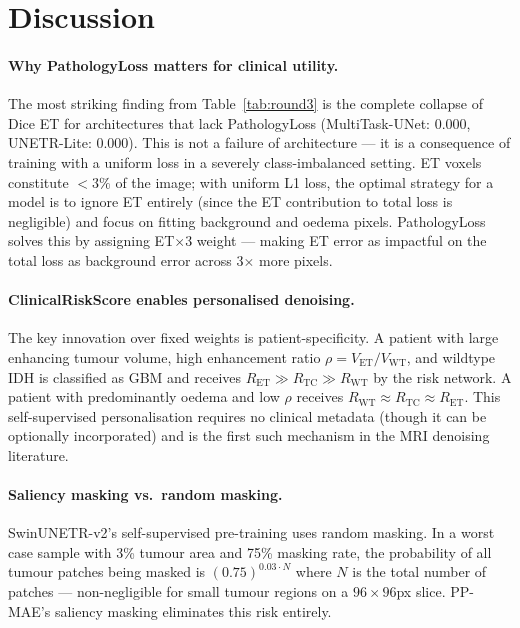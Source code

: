 \documentclass[runningheads]{llncs}
\begin{document}
\section{Discussion}
\label{sec:discussion}

\paragraph{Why PathologyLoss matters for clinical utility.}
The most striking finding from Table~\ref{tab:round3} is the complete
collapse of Dice ET for architectures that lack PathologyLoss
(MultiTask-UNet: 0.000, UNETR-Lite: 0.000). This is not a failure of
architecture — it is a consequence of training with a uniform loss
in a severely class-imbalanced setting. ET voxels constitute
$<3\%$ of the image; with uniform L1 loss, the optimal strategy
for a model is to ignore ET entirely (since the ET contribution
to total loss is negligible) and focus on fitting background and
oedema pixels. PathologyLoss solves this by assigning ET$\times$3
weight — making ET error as impactful on the total loss as
background error across 3$\times$ more pixels.

\paragraph{ClinicalRiskScore enables personalised denoising.}
The key innovation over fixed weights is patient-specificity.
A patient with large enhancing tumour volume, high enhancement
ratio $\rho = V_{\text{ET}}/V_{\text{WT}}$, and wildtype IDH
is classified as GBM and receives $R_{\text{ET}} \gg R_{\text{TC}} \gg R_{\text{WT}}$
by the risk network. A patient with predominantly oedema and
low $\rho$ receives $R_{\text{WT}} \approx R_{\text{TC}} \approx R_{\text{ET}}$.
This self-supervised personalisation requires no clinical metadata
(though it can be optionally incorporated) and is the first such
mechanism in the MRI denoising literature.

\paragraph{Saliency masking vs.\ random masking.}
SwinUNETR-v2's self-supervised pre-training uses random masking.
In a worst case sample with 3\% tumour area and 75\% masking rate,
the probability of all tumour patches being masked is
$(0.75)^{0.03 \cdot N}$ where $N$ is the total number of patches —
non-negligible for small tumour regions on a $96 \times 96$px slice.
PP-MAE's saliency masking eliminates this risk entirely.
\end{document}
